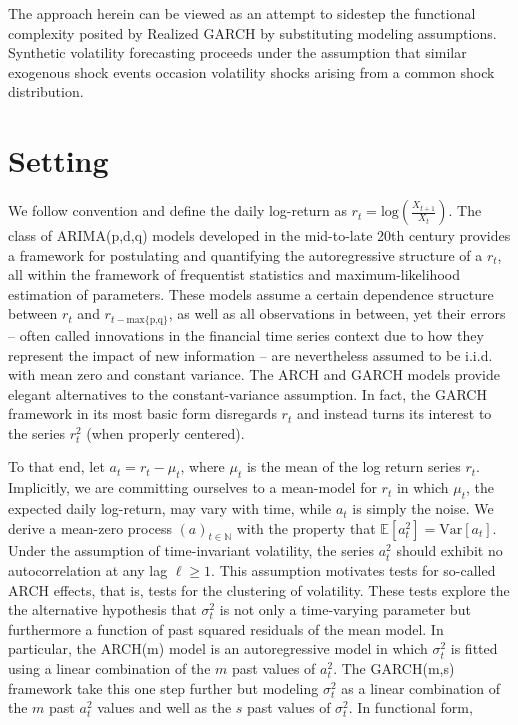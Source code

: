 \documentclass[11pt]{article}
\def\mrm#1{\mathrm{#1}} %
\def\E{\mathbb{E}} %
\theoremstyle{definition}
\begin{document}
The approach herein can be viewed as an attempt to sidestep the functional complexity posited by Realized GARCH by substituting modeling assumptions.  Synthetic volatility forecasting proceeds under the assumption that similar exogenous shock events occasion volatility shocks arising from a common shock distribution.


\section{Setting}

\label{section2}

We follow convention and define the daily log-return as $r_{t} = \text{log}(\frac{X_{t+1}}{X_{t}})$.  The class of ARIMA(p,d,q) models developed in the mid-to-late 20th century provides a framework for postulating and quantifying the autoregressive structure of a $r_{t}$, all within the framework of frequentist statistics and maximum-likelihood estimation of parameters.  These models assume a certain dependence structure between $r_{t}$ and $r_{t-\text{max\{p,q\}}}$, as well as all observations in between, yet their errors -- often called innovations in the financial time series context due to how they represent the impact of new information -- are nevertheless assumed to be i.i.d. with mean zero and constant variance.  The ARCH \citep{engle1982autoregressive} and GARCH \citep{bollerslev1986generalized} models provide elegant alternatives to the constant-variance assumption.  In fact, the GARCH framework in its most basic form disregards $r_{t}$ and instead turns its interest to the series $r_{t}^{2}$ (when properly centered).  

To that end, let $a_{t} = r_{t} - \mu_{t}$, where $\mu_{t}$ is the mean of the log return series $r_{t}$.  Implicitly, we are committing ourselves to a mean-model for $r_{t}$ in which $\mu_{t}$, the expected daily log-return, may vary with time, while $a_{t}$ is simply the noise.  We derive a mean-zero process $(a)_{t\in\mathbb{N}}$ with the property that $\E[a^{2}_{t}] = \mrm{Var}[a_{t}]$.  Under the assumption of time-invariant volatility, the series $a_{t}^{2}$ should exhibit no autocorrelation at any lag $\ell\geq1$.  This assumption motivates tests for so-called ARCH effects, that is, tests for the clustering of volatility.  These tests explore the the alternative hypothesis that $\sigma_{t}^{2}$ is not only a time-varying parameter but furthermore a function of past squared residuals of the mean model.  In particular, the ARCH(m) model is an autoregressive model in which $\sigma_{t}^{2}$ is fitted using a linear combination of the $m$ past values of $a_{t}^{2}$.  The GARCH(m,s) framework take this one step further but modeling $\sigma_{t}^{2}$ as a linear combination of the $m$ past $a_{t}^{2}$ values and well as the $s$ past values of $\sigma_{t}^{2}$.  In functional form,
\end{document}
